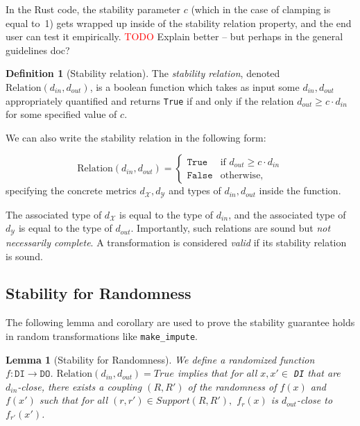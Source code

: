 \documentclass[11pt,a4paper]{article}
\newtheorem{lemma}{Lemma}
\theoremstyle{definition}
\newtheorem{definition}{Definition}[section]
\newcommand{\din}{d_{in}}
\newcommand{\dout}{d_{out}}
\newcommand{\Relation}{\mathrm{Relation}}
\newcommand{\X}{\mathcal{X}}
\newcommand{\Y}{\mathcal{Y}}
\newcommand{\True}{\texttt{True}}
\newcommand{\False}{\texttt{False}}
\newcommand{\grace}[1]{{ {\color{purple}{(grace)~#1}}}}
\newcommand{\todo}{{\textcolor{red}{TODO }}}
\begin{document}
In the Rust code, the stability parameter $c$ (which in the case of clamping is equal to~1) gets wrapped up inside of the stability relation property, and the end user can test it empirically. \todo{Explain better -- but perhaps in the general guidelines doc?}

\begin{definition}[Stability relation]
    The \textit{stability relation}, denoted $\Relation(\din, \dout)$, is a boolean function which takes as input some $\din, \dout$ appropriately quantified and returns \texttt{True} if and only if the relation $\dout \geq c \cdot \din$ for some specified value of $c$. 
\end{definition}

We can also write the stability relation in the following form:

\begin{equation}
    \Relation(\din, \dout) = 
    \begin{cases} 
      \True & \textrm{if } \dout \geq c \cdot \din \\
      \False & \textrm{otherwise},
   \end{cases}
\end{equation}
specifying the concrete metrics $d_{\X}, d_{\Y}$ and types of $\din, \dout$ inside the function.

The associated type of $d_{\X}$ is equal to the type of $\din$, and the associated type of $d_{\Y}$ is equal to the type of $\dout$. Importantly, such relations are sound but \textit{not necessarily complete}. A transformation is considered \textit{valid} if its stability relation is sound.


\subsection{Stability for Randomness}


The following lemma and corollary are used to prove the stability guarantee holds in random transformations like \texttt{make\_impute}. 
\begin{lemma}[Stability for Randomness]
We define a randomized function $f: \texttt{DI} \rightarrow \texttt{DO}$. $\Relation(d_{in}, d_{out}) = True$ implies that for all $x, x' \in$ \texttt{DI} that are $d_{in}$-close, there exists a coupling $(R, R')$ of the randomness of $f(x)$ and $f(x')$ such that for all $(r, r') \in Support(R, R'),$ $f_r(x)$ is $d_{out}$-close to $f_{r'}(x')$.
\end{lemma}
\end{document}

